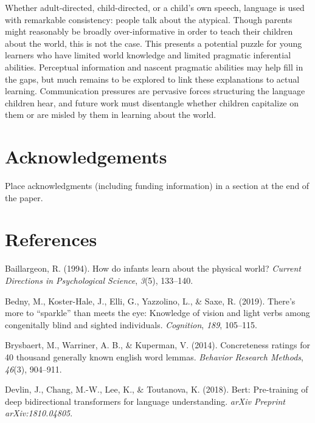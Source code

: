 \documentclass[10pt, letterpaper]{article}
\begin{document}
Whether adult-directed, child-directed, or a child's own speech,
language is used with remarkable consistency: people talk about the
atypical. Though parents might reasonably be broadly over-informative in
order to teach their children about the world, this is not the case.
This presents a potential puzzle for young learners who have limited
world knowledge and limited pragmatic inferential abilities. Perceptual
information and nascent pragmatic abilities may help fill in the gaps,
but much remains to be explored to link these explanations to actual
learning. Communication pressures are pervasive forces structuring the
language children hear, and future work must disentangle whether
children capitalize on them or are misled by them in learning about the
world.

\hypertarget{acknowledgements}{%
\section{Acknowledgements}\label{acknowledgements}}

Place acknowledgments (including funding information) in a section at
the end of the paper.

\hypertarget{references}{%
\section{References}\label{references}}

\setlength{\parindent}{-0.1in} 
\setlength{\leftskip}{0.125in}

\noindent

\hypertarget{refs}{}
\leavevmode\hypertarget{ref-baillargeon1994}{}%
Baillargeon, R. (1994). How do infants learn about the physical world?
\emph{Current Directions in Psychological Science}, \emph{3}(5),
133--140.

\leavevmode\hypertarget{ref-bedny2019}{}%
Bedny, M., Koster-Hale, J., Elli, G., Yazzolino, L., \& Saxe, R. (2019).
There's more to ``sparkle'' than meets the eye: Knowledge of vision and
light verbs among congenitally blind and sighted individuals.
\emph{Cognition}, \emph{189}, 105--115.

\leavevmode\hypertarget{ref-brysbaert2014}{}%
Brysbaert, M., Warriner, A. B., \& Kuperman, V. (2014). Concreteness
ratings for 40 thousand generally known english word lemmas.
\emph{Behavior Research Methods}, \emph{46}(3), 904--911.

\leavevmode\hypertarget{ref-devlin2018}{}%
Devlin, J., Chang, M.-W., Lee, K., \& Toutanova, K. (2018). Bert:
Pre-training of deep bidirectional transformers for language
understanding. \emph{arXiv Preprint arXiv:1810.04805}.
\end{document}
